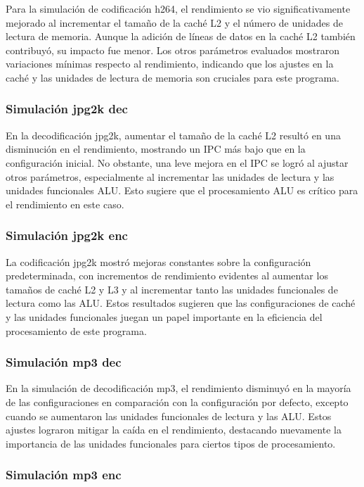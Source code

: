 \documentclass[conference]{IEEEtran}
\begin{document}
Para la simulación de codificación h264, el rendimiento se vio significativamente mejorado al incrementar el tamaño de la caché L2 y el número de unidades de lectura de memoria. Aunque la adición de líneas de datos en la caché L2 también contribuyó, su impacto fue menor. Los otros parámetros evaluados mostraron variaciones mínimas respecto al rendimiento, indicando que los ajustes en la caché y las unidades de lectura de memoria son cruciales para este programa.

\subsubsection{Simulación jpg2k dec}

En la decodificación jpg2k, aumentar el tamaño de la caché L2 resultó en una disminución en el rendimiento, mostrando un IPC más bajo que en la configuración inicial. No obstante, una leve mejora en el IPC se logró al ajustar otros parámetros, especialmente al incrementar las unidades de lectura y las unidades funcionales ALU. Esto sugiere que el procesamiento ALU es crítico para el rendimiento en este caso.

\subsubsection{Simulación jpg2k enc}

La codificación jpg2k mostró mejoras constantes sobre la configuración predeterminada, con incrementos de rendimiento evidentes al aumentar los tamaños de caché L2 y L3 y al incrementar tanto las unidades funcionales de lectura como las ALU. Estos resultados sugieren que las configuraciones de caché y las unidades funcionales juegan un papel importante en la eficiencia del procesamiento de este programa.

\subsubsection{Simulación mp3 dec}

En la simulación de decodificación mp3, el rendimiento disminuyó en la mayoría de las configuraciones en comparación con la configuración por defecto, excepto cuando se aumentaron las unidades funcionales de lectura y las ALU. Estos ajustes lograron mitigar la caída en el rendimiento, destacando nuevamente la importancia de las unidades funcionales para ciertos tipos de procesamiento.

\subsubsection{Simulación mp3 enc}
\end{document}
